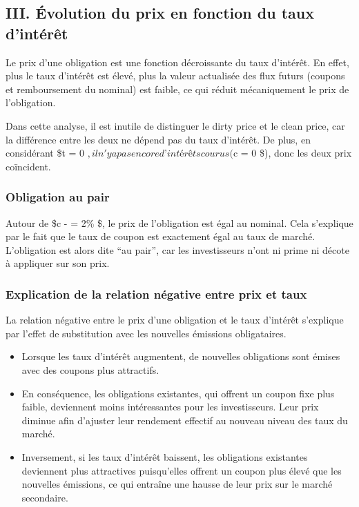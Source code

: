 \documentclass[
  letterpaper,
  DIV=11,
  numbers=noendperiod]{scrartcl}
\providecommand{\tightlist}{%
  \setlength{\itemsep}{0pt}\setlength{\parskip}{0pt}}\usepackage{longtable,booktabs,array}
\begin{document}
\subsection{III. Évolution du prix en fonction du taux
d'intérêt}\label{iii.-uxe9volution-du-prix-en-fonction-du-taux-dintuxe9ruxeat}

Le prix d'une obligation est une fonction décroissante du taux
d'intérêt. En effet, plus le taux d'intérêt est élevé, plus la valeur
actualisée des flux futurs (coupons et remboursement du nominal) est
faible, ce qui réduit mécaniquement le prix de l'obligation.

Dans cette analyse, il est inutile de distinguer le dirty price et le
clean price, car la différence entre les deux ne dépend pas du taux
d'intérêt. De plus, en considérant \$t = 0
\(, il n'y a pas encore d’intérêts courus (\)c = 0 \$), donc les deux
prix coïncident.

\subsubsection{Obligation au pair}\label{obligation-au-pair}

Autour de \$c - \lambda = 2\% \$, le prix de l'obligation est égal au
nominal. Cela s'explique par le fait que le taux de coupon est
exactement égal au taux de marché. L'obligation est alors dite ``au
pair'', car les investisseurs n'ont ni prime ni décote à appliquer sur
son prix.

\subsubsection{Explication de la relation négative entre prix et
taux}\label{explication-de-la-relation-nuxe9gative-entre-prix-et-taux}

La relation négative entre le prix d'une obligation et le taux d'intérêt
s'explique par l'effet de substitution avec les nouvelles émissions
obligataires.

\begin{itemize}
\tightlist
\item
  Lorsque les taux d'intérêt augmentent, de nouvelles obligations sont
  émises avec des coupons plus attractifs.\\
\item
  En conséquence, les obligations existantes, qui offrent un coupon fixe
  plus faible, deviennent moins intéressantes pour les investisseurs.
  Leur prix diminue afin d'ajuster leur rendement effectif au nouveau
  niveau des taux du marché.\\
\item
  Inversement, si les taux d'intérêt baissent, les obligations
  existantes deviennent plus attractives puisqu'elles offrent un coupon
  plus élevé que les nouvelles émissions, ce qui entraîne une hausse de
  leur prix sur le marché secondaire.
\end{itemize}
\end{document}
